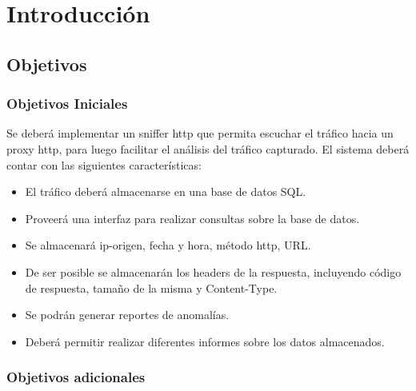 \section{Introducción}

\subsection{Objetivos}

\subsubsection{Objetivos Iniciales}

 Se deberá implementar un sniffer http que permita escuchar el tráfico hacia un proxy http, para luego facilitar el análisis del tráfico capturado. El sistema deberá contar con las siguientes características:
\\
\begin{itemize}
	\item El tráfico deberá almacenarse en una base de datos SQL.
	\item Proveerá una interfaz para realizar consultas sobre la base de datos.
	\item Se almacenará ip-origen, fecha y hora, método http, URL.
	\item De ser posible se almacenarán los headers de la respuesta, incluyendo código de respuesta, tamaño de la misma y Content-Type.
	\item Se podrán generar reportes de anomalías.
	\item Deberá permitir realizar diferentes informes sobre los datos almacenados.
\end{itemize}

\subsubsection{Objetivos adicionales}

